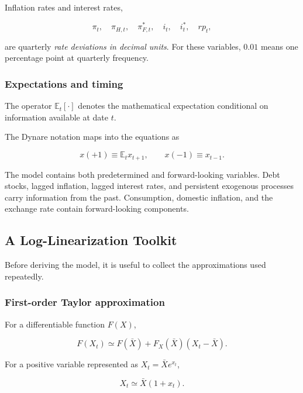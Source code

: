 Inflation rates and interest rates,

\[
\pi_t,\quad \pi_{H,t},\quad \pi_{F,t}^{*},\quad
i_t,\quad i_t^{*},\quad rp_t,
\]

are quarterly \emph{rate deviations in decimal units}. For these variables,
\(0.01\) means one percentage point at quarterly frequency.

\subsubsection{Expectations and timing}

The operator \(\mathbb E_t[\cdot]\) denotes the mathematical expectation
conditional on information available at date \(t\).

The Dynare notation maps into the equations as

\[
x(+1)\equiv \mathbb E_t x_{t+1},
\qquad
x(-1)\equiv x_{t-1}.
\]

The model contains both predetermined and forward-looking variables. Debt
stocks, lagged inflation, lagged interest rates, and persistent exogenous
processes carry information from the past. Consumption, domestic inflation, and
the exchange rate contain forward-looking components.

\subsection{A Log-Linearization Toolkit}
\label{app:linearization_toolkit}

Before deriving the model, it is useful to collect the approximations used
repeatedly.

\subsubsection{First-order Taylor approximation}

For a differentiable function \(F(X)\),

\begin{equation}
F(X_t)
\simeq
F(\bar X)
+
F_X(\bar X)(X_t-\bar X).
\end{equation}

For a positive variable represented as \(X_t=\bar X e^{x_t}\),

\begin{equation}
X_t
\simeq
\bar X(1+x_t).
\end{equation}

